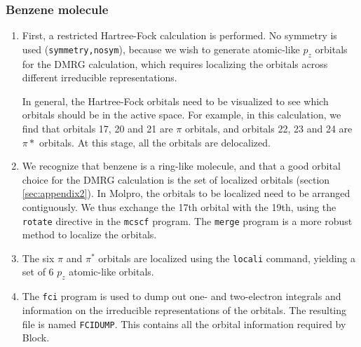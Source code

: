 \documentclass[letterpaper,12pt,aps, pra]{revtex4-1}
\begin{document}
 \subsubsection{Benzene molecule}
 \label{sec:appMolprobenz}
\begin{enumerate}

 \item First, a restricted Hartree-Fock calculation is performed. No symmetry
	 is used (\texttt{symmetry,nosym}), because we wish to generate
	 atomic-like $p_z$ orbitals for the DMRG calculation, which requires
	 localizing the orbitals across different irreducible representations. 

In general, the Hartree-Fock orbitals need to be visualized to see which
orbitals should be in the active space. For example, in this calculation, we
find that orbitals 17, 20 and 21 are $\pi$ orbitals, and orbitals 22, 23 and 24
are $\pi*$ orbitals.  At this stage, all the orbitals are delocalized.


\item We recognize that benzene is a ring-like molecule, and that a good
	orbital choice for the DMRG calculation is the set of localized
	orbitals (section \ref{sec:appendix2}). In Molpro, the orbitals to be
	localized need to be arranged contiguously. We thus exchange the 17th
	orbital with the 19th, using the \texttt{rotate} directive in the
	\texttt{mcscf} program. The \texttt{merge} program is a more robust
	method to localize the orbitals.


\item The six $\pi$ and $\pi^*$ orbitals are localized using the
	\texttt{locali} command, yielding a set of 6 $p_z$ atomic-like
	orbitals. 

\item The \texttt{fci} program is used to dump out one- and two-electron
integrals and information on the irreducible representations of the orbitals.
The resulting file is named \texttt{FCIDUMP}. This contains all the orbital
information required by Block.  \end{enumerate}
\end{document}
